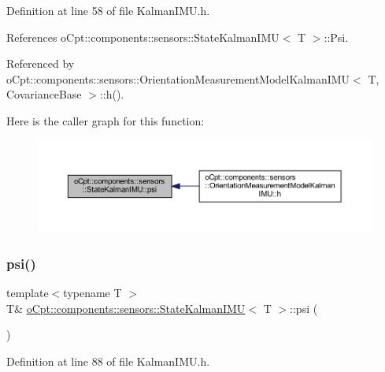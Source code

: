 Definition at line 58 of file Kalman\+I\+M\+U.\+h.



References o\+Cpt\+::components\+::sensors\+::\+State\+Kalman\+I\+M\+U$<$ T $>$\+::\+Psi.



Referenced by o\+Cpt\+::components\+::sensors\+::\+Orientation\+Measurement\+Model\+Kalman\+I\+M\+U$<$ T, Covariance\+Base $>$\+::h().

Here is the caller graph for this function\+:
\nopagebreak
\begin{figure}[H]
\begin{center}
\leavevmode
\includegraphics[width=350pt]{classo_cpt_1_1components_1_1sensors_1_1_state_kalman_i_m_u_a4d11449f57cc20aa89f310e80660401a_icgraph}
\end{center}
\end{figure}
\hypertarget{classo_cpt_1_1components_1_1sensors_1_1_state_kalman_i_m_u_a90666fa83a7d55b49eac4dc90e51c755}{}\label{classo_cpt_1_1components_1_1sensors_1_1_state_kalman_i_m_u_a90666fa83a7d55b49eac4dc90e51c755} 
\subsubsection{\texorpdfstring{psi()}{psi()}\hspace{0.1cm}{\footnotesize\ttfamily [2/2]}}
{\footnotesize\ttfamily template$<$typename T $>$ \\
T\& \hyperlink{classo_cpt_1_1components_1_1sensors_1_1_state_kalman_i_m_u}{o\+Cpt\+::components\+::sensors\+::\+State\+Kalman\+I\+MU}$<$ T $>$\+::psi (\begin{DoxyParamCaption}{ }\end{DoxyParamCaption})\hspace{0.3cm}{\ttfamily [inline]}}



Definition at line 88 of file Kalman\+I\+M\+U.\+h.



